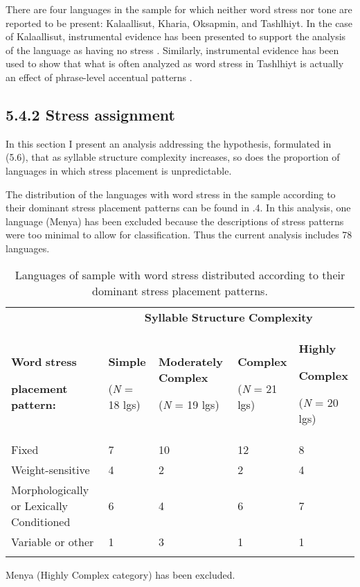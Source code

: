   There are four languages in the sample for which neither word stress nor tone are reported to be present: Kalaallisut, Kharia, Oksapmin, and Tashlhiyt. In the case of Kalaallisut, instrumental evidence has been presented to support the analysis of the language as having no stress \citep{Jacobsen2000}. Similarly, instrumental evidence has been used to show that what is often analyzed as word stress in Tashlhiyt is actually an effect of phrase-level accentual patterns \citep{RoettgerEtAl2015}.


\subsection{5.4.2 Stress assignment}

  In this section I present an analysis addressing the hypothesis, formulated in (5.6), that as syllable structure complexity increases, so does the proportion of languages in which stress placement is unpredictable.



  The distribution of the languages with word stress in the sample according to their dominant stress placement patterns can be found in .4. In this analysis, one language (Menya) has been excluded because the descriptions of stress patterns were too minimal to allow for classification. Thus the current analysis includes 78 languages.






\begin{table}
\begin{tabularx}{\textwidth}{XXXXX}
\lsptoprule
 & \multicolumn{4}{c}{ \textbf{Syllable} \textbf{Structure} \textbf{Complexity}}\\
{ \textbf{Word} \textbf{stress} }

 \textbf{placement} \textbf{pattern:} & { \textbf{Simple}}

 (\textit{N} = 18 lgs) & { \textbf{Moderately} \textbf{Complex}}

 (\textit{N} = 19 lgs) & { \textbf{Complex}}

 (\textit{N} = 21 lgs) & { \textbf{Highly} }

{ \textbf{Complex}}

 (\textit{N} = 20 lgs)\\
 Fixed & 7 & 10 & 12 & 8\\
 Weight-sensitive & 4 & 2 & 2 & 4\\
 Morphologically or Lexically Conditioned & 6 & 4 & 6 & 7\\
 Variable or other & 1 & 3 & 1 & 1\\
\lspbottomrule
\end{tabularx}
\caption{\label{5.4}Languages of sample with word stress distributed according to their dominant stress placement patterns.}Menya (Highly Complex category) has been excluded.
\end{table}





